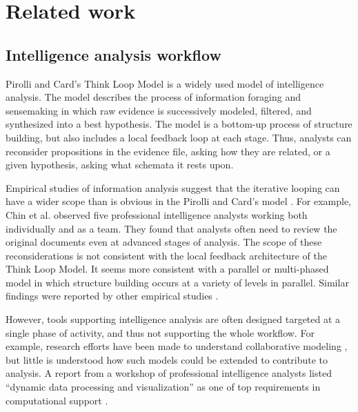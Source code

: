 \section{Related work}\label{related-work}

\subsection{Intelligence analysis workflow}

Pirolli and Card's Think Loop Model \cite{Pirolli2005} is a widely used model of intelligence analysis. The model describes the process of information foraging and sensemaking in which raw evidence is successively modeled, filtered, and synthesized into a best hypothesis. The model is a bottom-up process of structure building, but also includes a local feedback loop at each stage. Thus, analysts can reconsider propositions in the evidence file, asking how they are related, or a given hypothesis, asking what schemata it rests upon.

Empirical studies of information analysis suggest that the iterative looping can have a wider scope than is obvious in the Pirolli and Card's model \cite{Pirolli2005}. For example, Chin et al. \cite{Chin2009} observed five professional intelligence analysts working both individually and as a team. They found that analysts often need to review the original documents even at advanced stages of analysis. The scope of these reconsiderations is not consistent with the local feedback architecture of the Think Loop Model. It seems more consistent with a parallel or multi-phased model \cite{Wheaton2011} in which structure building occurs at a variety of levels in parallel. Similar findings were reported by other empirical studies \cite{Isenberg2008b,Kang2011,Herrmann2013a}.

However, tools supporting intelligence analysis are often designed targeted at a single phase of activity, and thus not supporting the whole workflow. For example, research efforts have been made to understand collaborative modeling \cite{Prilla2013}, but little is understood how such models could be extended to contribute to analysis.
A report from a workshop of professional intelligence analysts listed ``dynamic data processing and visualization'' as one of top requirements in computational support \cite{Badalamente2005}.


